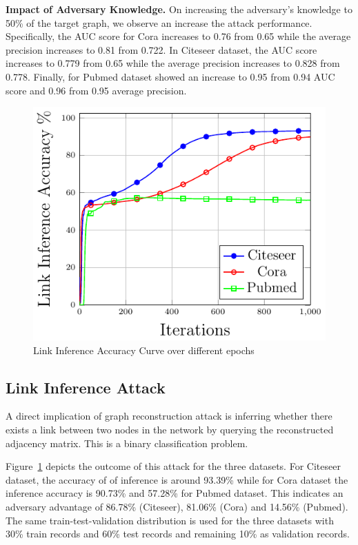 \noindent\textbf{Impact of Adversary Knowledge.} On increasing the adversary's knowledge to 50\% of the target graph, we observe an increase the attack performance.
Specifically, the AUC score for Cora increases to 0.76 from 0.65 while the average precision increases to 0.81 from 0.722.
In Citeseer dataset, the AUC score increases to 0.779 from 0.65 while the average precision increases to 0.828 from 0.778.
Finally, for Pubmed dataset showed an increase to 0.95 from 0.94 AUC score and 0.96 from 0.95 average precision.



\begin{figure}[t]
  \begin{center}
    \includegraphics[width=0.5\linewidth]{figures/LinkInfer/LinkInfer.pdf}
  \end{center}
  \caption{Link Inference Accuracy Curve over different epochs}
\label{fig:lia}
\end{figure}


\subsection{Link Inference Attack}

A direct implication of graph reconstruction attack is inferring whether there exists a link between two nodes in the network by querying the reconstructed adjacency matrix.
This is a binary classification problem.

Figure~\ref{fig:lia} depicts the outcome of this attack for the three datasets.
For Citeseer dataset, the accuracy of of inference is around 93.39\% while for Cora dataset the inference accuracy is 90.73\% and 57.28\% for Pubmed dataset.
This indicates an adversary advantage of 86.78\% (Citeseer), 81.06\% (Cora) and 14.56\% (Pubmed).
The same train-test-validation distribution is used for the three datasets with 30\% train records and 60\% test records and remaining 10\% as validation records.



